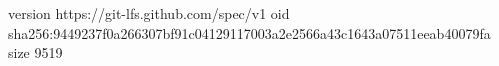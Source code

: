version https://git-lfs.github.com/spec/v1
oid sha256:9449237f0a266307bf91c04129117003a2e2566a43c1643a07511eeab40079fa
size 9519

